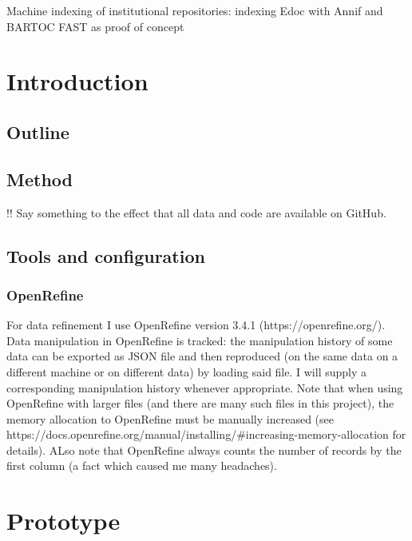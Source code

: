 Machine indexing of institutional repositories: indexing Edoc with Annif
and BARTOC FAST as proof of concept

\hypertarget{introduction}{%
\section{Introduction}\label{introduction}}

\hypertarget{outline}{%
\subsection{Outline}\label{outline}}

\hypertarget{method}{%
\subsection{Method}\label{method}}

!! Say something to the effect that all data and code are available on
GitHub.

\hypertarget{tools-and-configuration}{%
\subsection{Tools and configuration}\label{tools-and-configuration}}

\hypertarget{openrefine}{%
\subsubsection{OpenRefine}\label{openrefine}}

For data refinement I use OpenRefine version 3.4.1
(https://openrefine.org/). Data manipulation in OpenRefine is tracked:
the manipulation history of some data can be exported as JSON file and
then reproduced (on the same data on a different machine or on different
data) by loading said file. I will supply a corresponding manipulation
history whenever appropriate. Note that when using OpenRefine with
larger files (and there are many such files in this project), the memory
allocation to OpenRefine must be manually increased (see
https://docs.openrefine.org/manual/installing/\#increasing-memory-allocation
for details). ALso note that OpenRefine always counts the number of
records by the first column (a fact which caused me many headaches).

\hypertarget{prototype}{%
\section{Prototype}\label{prototype}}

